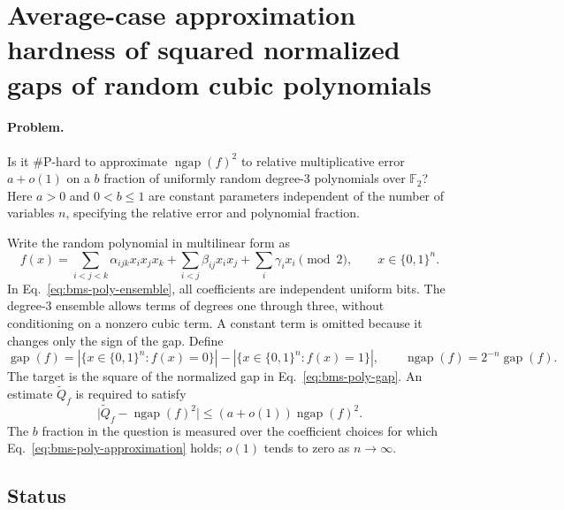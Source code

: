\section{Average-case approximation hardness of squared normalized gaps of random cubic polynomials}
\label{sec:op_406a00f7c5a9398c}

\paragraph{Problem.}
Is it $\#\mathrm{P}$-hard to approximate $\operatorname{ngap}(f)^2$ to
relative multiplicative error $a+o(1)$ on a $b$ fraction of uniformly random
degree-3 polynomials over $\mathbb{F}_2$?
Here $a>0$ and $0<b\leq1$ are constant parameters independent of the number
of variables $n$, specifying the relative error and polynomial fraction.

Write the random polynomial in multilinear form as
\begin{equation}
  f(x)=\sum_{i<j<k}\alpha_{ijk}x_i x_j x_k
       +\sum_{i<j}\beta_{ij}x_i x_j
       +\sum_i\gamma_i x_i \pmod{2},
  \qquad x\in\{0,1\}^n.
  \label{eq:bms-poly-ensemble}
\end{equation}
In Eq.~\eqref{eq:bms-poly-ensemble}, all coefficients are independent uniform
bits. The degree-3 ensemble allows terms of degrees one through three,
without conditioning on a nonzero cubic term. A constant term is omitted
because it changes only the sign of the gap. Define
\begin{equation}
  \operatorname{gap}(f)
    =|\{x\in\{0,1\}^n:f(x)=0\}|-|\{x\in\{0,1\}^n:f(x)=1\}|,
  \qquad
  \operatorname{ngap}(f)=2^{-n}\operatorname{gap}(f).
  \label{eq:bms-poly-gap}
\end{equation}
The target is the square of the normalized gap in Eq.~\eqref{eq:bms-poly-gap}.
An estimate $\widetilde Q_f$ is required to satisfy
\begin{equation}
  \bigl|\widetilde Q_f-\operatorname{ngap}(f)^2\bigr|
    \leq(a+o(1))\operatorname{ngap}(f)^2.
  \label{eq:bms-poly-approximation}
\end{equation}
The $b$ fraction in the question is measured over the coefficient choices
for which Eq.~\eqref{eq:bms-poly-approximation} holds; $o(1)$ tends to zero
as $n\to\infty$.

\subsection*{Status}

